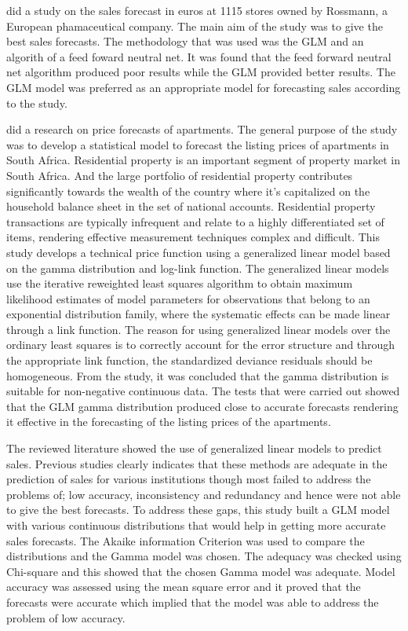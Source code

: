 \citet{sazontyevrossmann} did a study on the sales forecast in euros at 1115 stores owned by Rossmann, a European phamaceutical company. The main aim of the study was to give the best sales forecasts. The methodology that was used was the GLM and an algorith of a feed foward neutral net. It was found that the feed forward neutral net algorithm produced poor results while the GLM provided better results. The GLM model was preferred as an appropriate model for forecasting sales according to the study.

\citet{bax2018listing} did a research on price forecasts of apartments. The general purpose of the study was to develop a statistical model to forecast the listing prices of apartments in South Africa. Residential property is an important segment of property market in South Africa. And the large portfolio of residential property contributes significantly towards the wealth of the country where it's capitalized on the household balance sheet in the set of national accounts. Residential property transactions are typically infrequent and relate to a highly differentiated set of items, rendering effective measurement techniques complex and difficult. This study develops a technical price function using a generalized linear model based on the gamma distribution and log-link function. The generalized linear models use the iterative reweighted least squares algorithm to obtain maximum likelihood estimates of model parameters for observations that belong to an exponential distribution family, where the systematic effects can be made linear through a link function. The reason for using generalized linear models over the ordinary least squares is to correctly account for the error structure and through the appropriate link function, the standardized deviance residuals should be homogeneous. From the study, it was concluded that the gamma distribution is suitable for non-negative continuous data. The tests that were carried out showed that the GLM gamma distribution produced close to accurate forecasts rendering it effective in the forecasting of the listing prices of the apartments.

The reviewed literature showed the use of generalized linear models to predict sales. Previous studies clearly indicates that these methods are adequate in the prediction of sales for various institutions though most failed to address the problems of; low accuracy, inconsistency and redundancy and hence were not able to give the best forecasts. To address these gaps, this study built a GLM model with  various continuous distributions that would help in getting more accurate sales forecasts. The Akaike information Criterion was used to compare the distributions and the Gamma model was chosen. The adequacy was checked using Chi-square and this showed that the chosen Gamma model was adequate. Model accuracy was assessed using the mean square error and it proved that the forecasts were accurate which implied that the  model was able to address the problem of low accuracy. 
